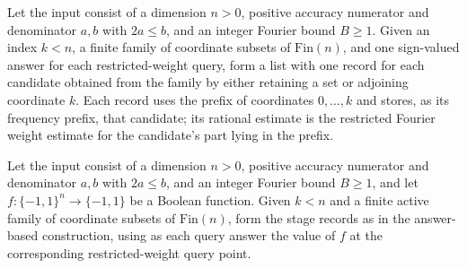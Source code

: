 \begin{definition}
\label{FABL.deterministicGoldreichLevinStageRecordsFromAnswers}
\leanok
{}
Let the input consist of a dimension $n>0$, positive accuracy numerator and denominator
$a,b$ with $2a\le b$, and an integer Fourier bound $B\ge1$. Given an index $k<n$, a
finite family of coordinate subsets of $\mathrm{Fin}(n)$, and one sign-valued answer for
each restricted-weight query, form a list with one record for each candidate obtained
from the family by either retaining a set or adjoining coordinate $k$. Each record uses
the prefix of coordinates $0,\ldots,k$ and stores, as its frequency prefix, that
candidate; its rational estimate is the restricted Fourier weight estimate for the
candidate's part lying in the prefix.
\end{definition}

\begin{definition}
\label{FABL.deterministicGoldreichLevinStageRecords}
\leanok
{}
Let the input consist of a dimension $n>0$, positive accuracy numerator and denominator
$a,b$ with $2a\le b$, and an integer Fourier bound $B\ge1$, and let
$f:\{−1,1\}^n\to\{−1,1\}$ be a Boolean function. Given $k<n$ and a finite active family
of coordinate subsets of $\mathrm{Fin}(n)$, form the stage records as in the
answer-based construction, using as each query answer the value of $f$ at the
corresponding restricted-weight query point.
\end{definition}

